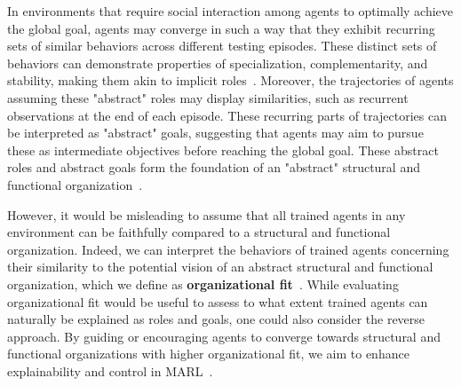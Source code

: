 \documentclass[conference]{IEEEtran}
\begin{document}
In environments that require social interaction among agents to optimally achieve the global goal, agents may converge in such a way that they exhibit recurring sets of similar behaviors across different testing episodes. 
These distinct sets of behaviors can demonstrate properties of specialization, complementarity, and stability, making them akin to implicit roles~\cite{wilson2008learning, yang2021role}. 
Moreover, the trajectories of agents assuming these "abstract" roles may display similarities, such as recurrent observations at the end of each episode. 
These recurring parts of trajectories can be interpreted as "abstract" goals, suggesting that agents may aim to pursue these as intermediate objectives before reaching the global goal. 
These abstract roles and abstract goals form the foundation of an "abstract" structural and functional organization~\cite{foerster2018counterfactual, liu2021efficient}.

However, it would be misleading to assume that all trained agents in any environment can be faithfully compared to a structural and functional organization. 
Indeed, we can interpret the behaviors of trained agents concerning their similarity to the potential vision of an abstract structural and functional organization, which we define as \textbf{organizational fit}~\cite{berenji2000learning, serrino2019finding}. 
While evaluating organizational fit would be useful to assess to what extent trained agents can naturally be explained as roles and goals, one could also consider the reverse approach. 
By guiding or encouraging agents to converge towards structural and functional organizations with higher organizational fit, we aim to enhance explainability and control in MARL~\cite{van2018explainable, alshiekh2018safe}.

\
\end{document}
